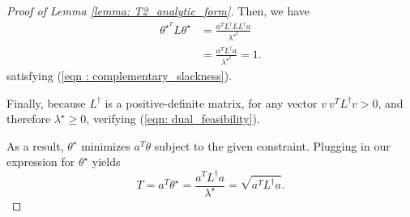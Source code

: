 \documentclass{article}
\newcommand{\Linv}{L^{\dagger}}
\theoremstyle{alden}
\theoremstyle{definition}
\theoremstyle{remark}
\begin{document}
\begin{proof}[Proof of Lemma \ref{lemma: T2_analytic_form}]
	Then, we have
	\begin{align*}
	{\theta}^{\star^{T}} L \theta^{\star} & = \frac{a^T \Linv L \Linv a}{\lambda^{\star^2}} \\
	& = \frac{a^T \Linv a}{\lambda^{\star^2}} = 1.
	\end{align*}
	satisfying (\ref{eqn : complementary_slackness}).
	
	Finally, because $L^{\dagger}$ is a positive-definite matrix, for any vector $v ~ v^T\Linv v > 0$, and therefore $\lambda^{\star} \geq 0$, verifying (\ref{eqn: dual_feasibility}). 
	
	As a result, $\theta^{\star}$ minimizes $a^T \theta$ subject to the given constraint. Plugging in our expression for $\theta^{\star}$ yields
	\begin{equation*}
	T = a^T \theta^{\star} = \frac{a^T \Linv a}{\lambda^{\star}} = \sqrt{a^T \Linv a}.
	\end{equation*}	
\end{proof}
\end{document}
